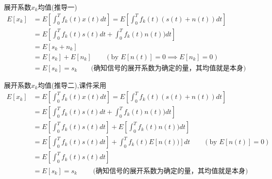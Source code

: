 \begin{frame}{展开系数$x_k$均值(推导一)}
\begin{align*}
E[x_k]&=E\left[\int_{0}^{T}f_k(t)x(t)dt\right]=E\left[\int_{0}^{T}f_k(t)(s(t)+n(t))dt\right]\\
&=E\left[\int_{0}^{T}f_k(t)s(t)dt+\int_{0}^{T}f_k(t)n(t))dt\right]\\
&=E[s_k+n_k]\\
&=E[s_k]+E[n_k]\qquad (\text{by }E[n(t)]=0\implies E[n_k]=0)\\
&= E[s_k] = s_k\qquad \text{(确知信号的展开系数为确定的量，其均值就是本身)}
\end{align*}
\end{frame}

\begin{frame}{展开系数$x_k$均值(推导二),课件采用}
\begin{align*}
E[x_k]&=E\left[\int_{0}^{T}f_k(t)x(t)dt\right]=E\left[\int_{0}^{T}f_k(t)(s(t)+n(t))dt\right]\\
&=E\left[\int_{0}^{T}f_k(t)s(t)dt+\int_{0}^{T}f_k(t)n(t))dt\right]\\
&=E\left[\int_{0}^{T}f_k(t)s(t)dt\right]+E\left[\int_{0}^{T}f_k(t)n(t))dt\right]\\
&=E\left[\int_{0}^{T}f_k(t)s(t)dt\right]+\int_{0}^{T}f_k(t)E[n(t))]dt \qquad  (\text{by }E[n(t)]=0)\\
&=E\left[\int_{0}^{T}f_k(t)s(t)dt\right]\\
&= E[s_k] = s_k\qquad \text{  (确知信号的展开系数为确定的量，其均值就是本身)}
\end{align*}
\end{frame}

